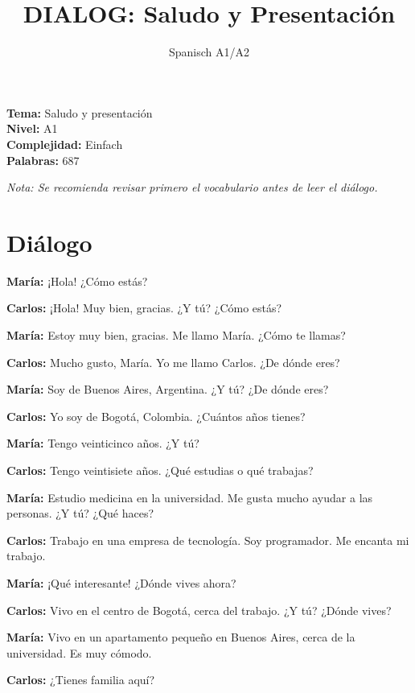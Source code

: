 \documentclass[12pt,a4paper]{article}
\begin{document}
\title{\textbf{DIALOG: Saludo y Presentación}}
\author{Spanisch A1/A2}
\date{}
\maketitle

\textbf{Tema:} Saludo y presentación \\
\textbf{Nivel:} A1 \\
\textbf{Complejidad:} Einfach \\
\textbf{Palabras:} 687

\vspace{1em}

\textit{Nota: Se recomienda revisar primero el vocabulario antes de leer el diálogo.}

\vspace{1em}

\section*{Diálogo}

\textbf{María:} ¡Hola! ¿Cómo estás?

\textbf{Carlos:} ¡Hola! Muy bien, gracias. ¿Y tú? ¿Cómo estás?

\textbf{María:} Estoy muy bien, gracias. Me llamo María. ¿Cómo te llamas?

\textbf{Carlos:} Mucho gusto, María. Yo me llamo Carlos. ¿De dónde eres?

\textbf{María:} Soy de Buenos Aires, Argentina. ¿Y tú? ¿De dónde eres?

\textbf{Carlos:} Yo soy de Bogotá, Colombia. ¿Cuántos años tienes?

\textbf{María:} Tengo veinticinco años. ¿Y tú?

\textbf{Carlos:} Tengo veintisiete años. ¿Qué estudias o qué trabajas?

\textbf{María:} Estudio medicina en la universidad. Me gusta mucho ayudar a las personas. ¿Y tú? ¿Qué haces?

\textbf{Carlos:} Trabajo en una empresa de tecnología. Soy programador. Me encanta mi trabajo.

\textbf{María:} ¡Qué interesante! ¿Dónde vives ahora?

\textbf{Carlos:} Vivo en el centro de Bogotá, cerca del trabajo. ¿Y tú? ¿Dónde vives?

\textbf{María:} Vivo en un apartamento pequeño en Buenos Aires, cerca de la universidad. Es muy cómodo.

\textbf{Carlos:} ¿Tienes familia aquí?
\end{document}
